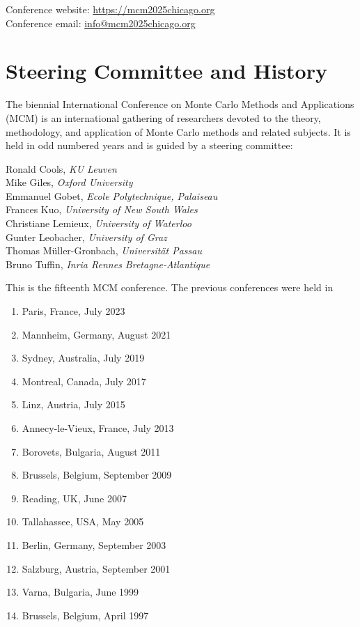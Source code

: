 \clearpage

Conference website: \url{https://mcm2025chicago.org} \\
Conference email: \url{info@mcm2025chicago.org}



\section{Steering Committee and History}


The biennial International Conference on Monte Carlo Methods and Applications (MCM) is an international gathering of researchers devoted to the theory, methodology, and application of Monte Carlo methods and related subjects. It is held in odd numbered years and is guided by a steering committee:

Ronald Cools, \emph{KU Leuven} \\
Mike Giles, \emph{Oxford University} \\
Emmanuel Gobet, \emph{Ecole Polytechnique, Palaiseau} \\
Frances Kuo, \emph{University of New South Wales} \\
Christiane Lemieux, \emph{University of Waterloo} \\
Gunter Leobacher, \emph{University of Graz} \\
Thomas Müller-Gronbach, \emph{Universität Passau} \\
Bruno Tuffin, \emph{Inria Rennes Bretagne-Atlantique}

This is the fifteenth MCM conference.  The previous  conferences were held in
\begin{enumerate}
\item Paris, France, July 2023
\item Mannheim, Germany, August 2021
\item Sydney, Australia, July 2019
\item Montreal, Canada, July 2017
\item Linz, Austria, July 2015
\item Annecy-le-Vieux, France, July 2013
\item Borovets, Bulgaria, August 2011
\item Brussels, Belgium, September 2009
\item Reading, UK, June 2007
\item Tallahassee, USA, May 2005
\item Berlin, Germany, September 2003
\item Salzburg, Austria, September 2001
\item Varna, Bulgaria, June 1999
\item Brussels, Belgium, April 1997
\end{enumerate}

